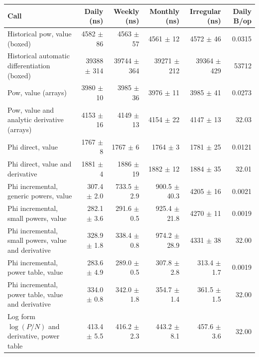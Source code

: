 \begin{tabular}{lrrrrr}
\toprule
Call & Daily (ns) & Weekly (ns) & Monthly (ns) & Irregular (ns) & Daily B/op \\
\midrule
Historical pow, value (boxed) & 4582 $\pm$ 86 & 4563 $\pm$ 57 & 4561 $\pm$ 12 & 4572 $\pm$ 46 & 0.0315 \\
Historical automatic differentiation (boxed) & 39388 $\pm$ 314 & 39744 $\pm$ 364 & 39271 $\pm$ 212 & 39364 $\pm$ 429 & 53712 \\
Pow, value (arrays) & 3980 $\pm$ 10 & 3985 $\pm$ 36 & 3976 $\pm$ 11 & 3985 $\pm$ 41 & 0.0273 \\
Pow, value and analytic derivative (arrays) & 4153 $\pm$ 16 & 4149 $\pm$ 13 & 4154 $\pm$ 22 & 4147 $\pm$ 13 & 32.03 \\
Phi direct, value & 1767 $\pm$ 8 & 1767 $\pm$ 6 & 1764 $\pm$ 3 & 1781 $\pm$ 25 & 0.0121 \\
Phi direct, value and derivative & 1881 $\pm$ 4 & 1886 $\pm$ 19 & 1882 $\pm$ 12 & 1884 $\pm$ 35 & 32.01 \\
Phi incremental, generic powers, value & 307.4 $\pm$ 2.0 & 733.5 $\pm$ 2.9 & 900.5 $\pm$ 40.3 & 4205 $\pm$ 16 & 0.0021 \\
Phi incremental, small powers, value & 282.1 $\pm$ 3.6 & 291.6 $\pm$ 0.5 & 925.4 $\pm$ 21.8 & 4270 $\pm$ 11 & 0.0019 \\
Phi incremental, small powers, value and derivative & 328.9 $\pm$ 1.8 & 338.4 $\pm$ 0.8 & 974.2 $\pm$ 28.9 & 4331 $\pm$ 38 & 32.00 \\
Phi incremental, power table, value & 283.6 $\pm$ 4.9 & 289.0 $\pm$ 0.5 & 307.8 $\pm$ 2.8 & 313.4 $\pm$ 1.7 & 0.0019 \\
Phi incremental, power table, value and derivative & 334.0 $\pm$ 0.8 & 342.0 $\pm$ 1.8 & 354.7 $\pm$ 1.4 & 361.5 $\pm$ 1.5 & 32.00 \\
Log form $\log(P/N)$ and derivative, power table & 413.4 $\pm$ 5.5 & 416.2 $\pm$ 2.3 & 443.2 $\pm$ 8.1 & 457.6 $\pm$ 3.6 & 32.00 \\
\bottomrule
\end{tabular}
